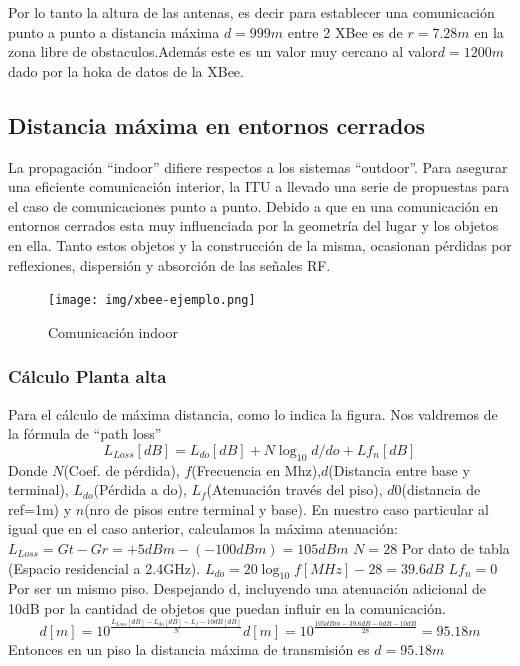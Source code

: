 \documentclass[11pt,oneside,spanish,a4paper]{article}
\begin{document}
Por lo tanto la altura de las antenas, es decir para establecer una comunicaci\'on punto a punto a distancia m\'axima $d=999m$ entre 2 XBee es de $r=7.28m$ en la zona libre de obstaculos.Adem\'as este es un valor muy cercano al valor$d=1200m$ dado por la hoka de datos de la XBee.

\subsection{Distancia m\'axima en entornos cerrados}

La propagaci\'on ``indoor'' difiere respectos a los sistemas ``outdoor''. Para asegurar una eficiente comunicaci\'on interior, la ITU a llevado una serie de propuestas para el caso de comunicaciones punto a punto. Debido a que en una comunicaci\'on en entornos cerrados esta muy influenciada por la geometr\'ia del lugar y los objetos en ella. Tanto estos objetos y la construcci\'on de la misma, ocasionan p\'erdidas por reflexiones, dispersi\'on y absorci\'on de las se\~nales RF.  

\begin{figure}[h]
	\centering\texttt{[image: img/xbee-ejemplo.png]}
	\caption{Comunicaci\'on indoor}
\end{figure}

\subsubsection{C\'alculo Planta alta}
Para el c\'alculo de m\'axima distancia, como lo indica la figura. Nos valdremos de la f\'ormula de ``path loss''\cite[Pág.4]{bilb:PathLoss}
\begin{equation*}
\label{eq:pathLoss}
L_{Loss}[dB] = L_{do}[dB] + N \log_{10}d/do + Lf_{n}[dB]
\end{equation*}
Donde $N$(Coef. de p\'erdida), $f$(Frecuencia en Mhz),$d$(Distancia entre base y terminal), $L_{do}$(P\'erdida a do), $L_{f}$(Atenuaci\'on trav\'es del piso), $d0$(distancia de ref=1m) y $n$(nro de pisos entre terminal y base).
En nuestro caso particular al igual que en el caso anterior, calculamos la m\'axima atenuaci\'on:
$L_{Loss}= Gt - Gr = +5dBm - (-100dBm) = 105dBm$
$N=28$ Por dato de tabla \cite[Pág 4-5]{bilb:PathLoss}(Espacio residencial a 2.4GHz).
$L_{do} = 20 \log_{10}f[MHz] - 28 = 39.6dB$
$Lf_{n} = 0$ Por ser un mismo piso.
Despejando d, incluyendo una atenuaci\'on adicional de 10dB por la cantidad de objetos que puedan influir en la comunicaci\'on.
\begin{equation*}
\label{eq:calculod}
d[m] = 10 ^{\frac{L_{Loss}[dB] - L_{do}[dB] - L_{f}-10dB[dB]}{N}} 
d[m] = 10 ^{\frac{105dBm - 39.6dB - 0dB - 10dB}{28}} = 95.18m
\end{equation*}
Entonces en un piso la distancia m\'axima de transmisi\'on es $d=95.18m$
\end{document}
